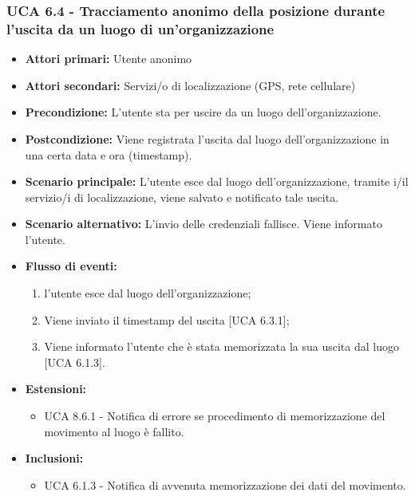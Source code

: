 \subsubsection{UCA 6.4 - Tracciamento anonimo della posizione durante l'uscita da un luogo di un'organizzazione}
\begin{itemize}
	\item \textbf{Attori primari:} Utente anonimo
	\item \textbf{Attori secondari:} Servizi/o di localizzazione (GPS, rete cellulare)
	\item \textbf{Precondizione:} L'utente sta per uscire da un luogo dell'organizzazione.
	\item \textbf{Postcondizione:} Viene registrata l'uscita dal luogo dell'organizzazione in una certa data e ora (timestamp).
	\item \textbf{Scenario principale:} L'utente esce dal luogo dell'organizzazione, tramite i/il servizio/i di localizzazione, viene salvato e notificato tale uscita. 
	\item \textbf{Scenario alternativo:} L'invio delle credenziali fallisce. Viene informato l'utente.
	\item \textbf{Flusso di eventi:}
	\begin{enumerate}
		\item l'utente esce dal luogo dell'organizzazione;
		\item Viene inviato il timestamp  del uscita [UCA 6.3.1];
		\item Viene informato l'utente che è stata memorizzata la sua uscita dal luogo [UCA 6.1.3].
	\end{enumerate}
	\item \textbf{Estensioni:}
	\begin{itemize}
		\item UCA 8.6.1 - Notifica di errore se procedimento di memorizzazione del movimento al luogo è fallito.
	\end{itemize}
	\item \textbf{Inclusioni:}
	\begin{itemize}
		\item UCA 6.1.3 - Notifica di avvenuta memorizzazione dei dati del movimento.
	\end{itemize}
\end{itemize}